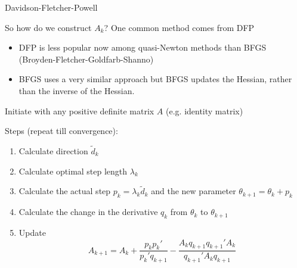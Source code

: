 \documentclass[notes,11pt, aspectratio=169]{beamer}
\newenvironment{wideitemize}{\itemize\addtolength{\itemsep}{10pt}}{\enditemize}
\begin{document}
  \begin{frame}{Davidson-Fletcher-Powell}
    \begin{wideitemize}

    \item So how do we construct $A_k$? One common method comes from DFP
      \begin{itemize}
      \item DFP is less popular now among quasi-Newton methods than  BFGS (Broyden-Fletcher-Goldfarb-Shanno)
      \item BFGS uses a very similar approach but BFGS updates the Hessian, rather than the inverse of the Hessian.
      \end{itemize}
    \item Initiate with any positive definite matrix $A$
      (e.g. identity matrix)
    \item Steps (repeat till convergence):
      \begin{enumerate}
      \item Calculate direction $\tilde{d}_{k}$
      \item Calculate optimal step length $\lambda_{k}$
      \item Calculate the actual step
        $p_{k} = \lambda_{k}\tilde{d}_{k}$ and the new parameter
        $\theta_{k+1} = \theta_{k}+ p_{k}$
      \item Calculate the change in the derivative $q_{k}$ from
        $\theta_{k}$ to $\theta_{k+1}$
      \item Update
        $$A_{k+1} = A_{k} + \frac{p_{k}p_{k}'}{p_{k}'q_{k+1}} - \frac{A_{k}q_{k+1}q_{k+1}'A_{k}}{q_{k+1}'A_{k}q_{k+1}}$$
      \end{enumerate}
    \end{wideitemize}
  \end{frame}
\end{document}
